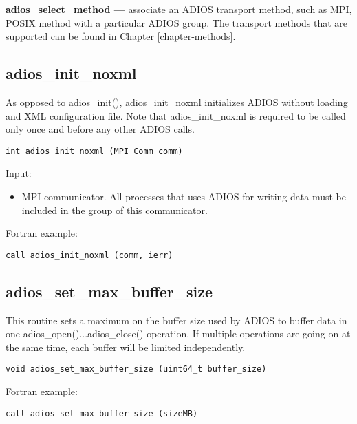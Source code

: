 \textbf{adios\_select\_method ---} associate an ADIOS transport method, such as MPI, 
POSIX method with a particular ADIOS group. The transport methods that are supported 
can be found in Chapter \ref{chapter-methods}.

\subsection{adios\_init\_noxml}

As opposed to adios\_init(), adios\_init\_noxml initializes ADIOS without loading
and XML configuration file. Note that adios\_init\_noxml is required to be called only 
once and before any other ADIOS calls. 

\begin{lstlisting}[alsolanguage=C,caption={},label={}]
int adios_init_noxml (MPI_Comm comm)
\end{lstlisting}

Input: 
\begin{itemize}
\item MPI communicator. All processes that uses ADIOS for writing data must be included in the group of this communicator.
\end{itemize}

Fortran example: 
\begin{lstlisting}[alsolanguage=Fortran,caption={},label={}]
call adios_init_noxml (comm, ierr)
\end{lstlisting}

\subsection{adios\_set\_max\_buffer\_size}
This routine sets a maximum on the buffer size used by ADIOS to buffer data in one adios\_open()...adios\_close() operation.
If multiple operations are going on at the same time, each buffer will be limited independently.

\begin{lstlisting}[alsolanguage=C,caption={},label={}]
void adios_set_max_buffer_size (uint64_t buffer_size)
\end{lstlisting}

Fortran example:
\begin{lstlisting}[alsolanguage=Fortran,caption={},label={}]
call adios_set_max_buffer_size (sizeMB)
\end{lstlisting}


